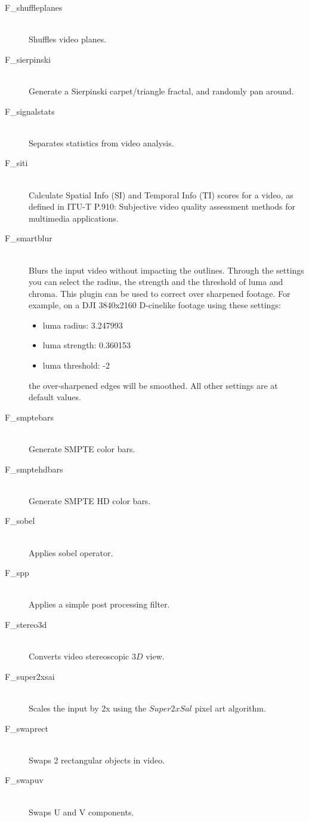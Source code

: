 \begin{description}
\item [F\_shuffleplanes]~\\Shuffles video planes.
\item [F\_sierpinski]~\\Generate a Sierpinski carpet/triangle fractal, and randomly pan around.
\item [F\_signalstats]~\\Separates statistics from video analysis.
\item [F\_siti]~\\Calculate Spatial Info (SI) and Temporal Info (TI) scores for a video, as defined in ITU-T P.910: Subjective video quality assessment methods for multimedia applications.
\item [F\_smartblur]~\\Blurs the input video without impacting
  the outlines. Through the settings you can select the radius, the
  strength and the threshold of luma and chroma. This plugin can be used to correct 
  over sharpened footage.  For example, on a DJI 3840x2160 D-cinelike footage using
  these settings:
\begin{itemize}
	\item luma radius: 3.247993
	\item luma strength: 0.360153
	\item luma threshold: -2
\end{itemize}
  the over-sharpened edges will be smoothed. All other settings are at default values.
\item [F\_smptebars]~\\Generate SMPTE color bars.
\item [F\_smptehdbars]~\\Generate SMPTE HD color bars.
\item [F\_sobel]~\\Applies sobel operator.
\item [F\_spp]~\\Applies a simple post processing filter.
\item [F\_stereo3d]~\\Converts video stereoscopic $3D$ view.
\item [F\_super2xsai]~\\Scales the input by 2x using the
  $Super2xSal$ pixel art algorithm.
\item [F\_swaprect]~\\Swaps 2 rectangular objects in video.
\item [F\_swapuv]~\\Swaps U and V components.

\end{description}
